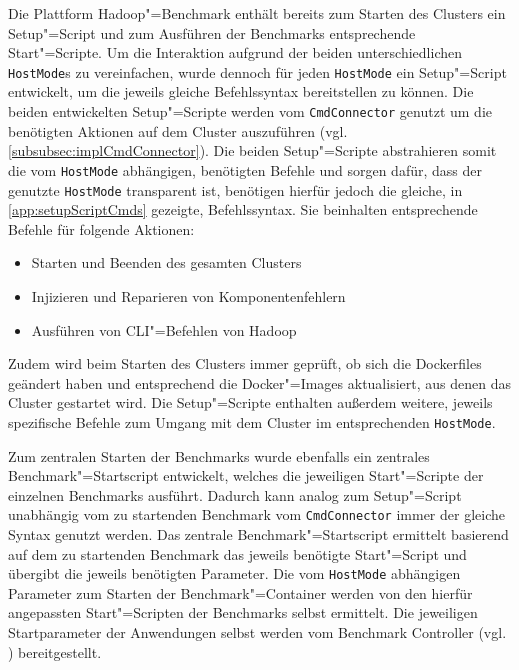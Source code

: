 Die Plattform Hadoop"=Benchmark enthält bereits zum Starten des Clusters ein Setup"=Script und zum Ausführen der Benchmarks entsprechende Start"=Scripte.
Um die Interaktion aufgrund der beiden unterschiedlichen \texttt{HostMode}s zu vereinfachen, wurde dennoch für jeden \texttt{HostMode} ein Setup"=Script entwickelt, um die jeweils gleiche Befehlssyntax bereitstellen zu können.
Die beiden entwickelten Setup"=Scripte werden vom \texttt{CmdConnector} genutzt um die benötigten Aktionen auf dem Cluster auszuführen (vgl. \cref{subsubsec:implCmdConnector}).
Die beiden Setup"=Scripte abstrahieren somit die vom \texttt{HostMode} abhängigen, benötigten Befehle und sorgen dafür, dass der genutzte \texttt{HostMode} transparent ist, benötigen hierfür jedoch die gleiche, in \cref{app:setupScriptCmds} gezeigte, Befehlssyntax.
Sie beinhalten entsprechende Befehle für folgende Aktionen:

\begin{itemize}
    \item Starten und Beenden des gesamten Clusters
    \item Injizieren und Reparieren von Komponentenfehlern
    \item Ausführen von \ac{CLI}"=Befehlen von Hadoop
\end{itemize}

Zudem wird beim Starten des Clusters immer geprüft, ob sich die Dockerfiles geändert haben und entsprechend die Docker"=Images aktualisiert, aus denen das Cluster gestartet wird.
Die Setup"=Scripte enthalten außerdem weitere, jeweils spezifische Befehle zum Umgang mit dem Cluster im entsprechenden \texttt{HostMode}.

Zum zentralen Starten der Benchmarks wurde ebenfalls ein zentrales Benchmark"=Startscript entwickelt, welches die jeweiligen Start"=Scripte der einzelnen Benchmarks ausführt.
Dadurch kann analog zum Setup"=Script unabhängig vom zu startenden Benchmark vom \texttt{CmdConnector} immer der gleiche Syntax genutzt werden.
Das zentrale Benchmark"=Startscript ermittelt basierend auf dem zu startenden Benchmark das jeweils benötigte Start"=Script und übergibt die jeweils benötigten Parameter.
Die vom \texttt{HostMode} abhängigen Parameter zum Starten der Benchmark"=Container werden von den hierfür angepassten Start"=Scripten der Benchmarks selbst ermittelt.
Die jeweiligen Startparameter der Anwendungen selbst werden vom Benchmark Controller (vgl. ) bereitgestellt.
